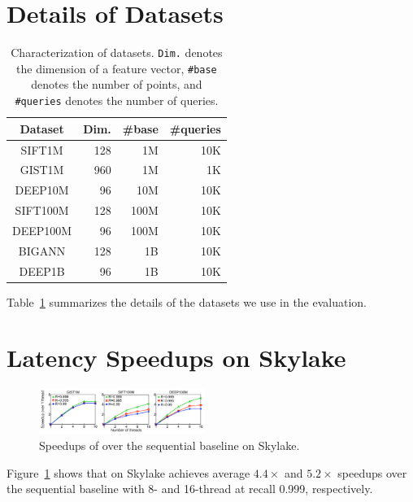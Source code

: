 \section{Details of Datasets} 
\begin{table}[h]
\small
\caption{Characterization of  datasets. \textmd{ {\tt Dim.} denotes the dimension of a feature vector, {\tt \#base} denotes the number of points, and {\tt \#queries} denotes the number of queries.}}\label{minjia_tab:datasets}
\centering
\begin{tabular}{|c|r|r|r|}
    \hline
    Dataset  & Dim. & \#base & \#queries \\ 
    \hline
    \hline
    SIFT1M  &       128 &      1M &        10K \\
    GIST1M  &       960 &      1M &         1K \\
    DEEP10M  &        96 &     10M &        10K \\
    SIFT100M &       128 &    100M &        10K \\
    DEEP100M &        96 &    100M &        10K \\ 
    BIGANN &       128 &    1B &        10K \\
    DEEP1B &        96 &    1B &        10K \\ \hline
\end{tabular}
\end{table}

Table~\ref{minjia_tab:datasets} summarizes the details of the datasets we use in the evaluation. 



\section{Latency Speedups on Skylake}

\begin{figure}[h!]
    \centering
    \includegraphics[width=0.48\textwidth]{submissions/Minjia2023/figures/eva_speedup_Skylake}
    \caption[Speedups of \Hammer]{Speedups of \Hammer over the sequential baseline on Skylake.}
    \label{minjia_fig:eval-speedup-skylake}
\end{figure}

Figure~\ref{minjia_fig:eval-speedup-skylake} shows that \Hammer on Skylake achieves average $4.4\times$ and $5.2\times$ speedups over the sequential baseline with 8- and 16-thread at recall 0.999, respectively. 

